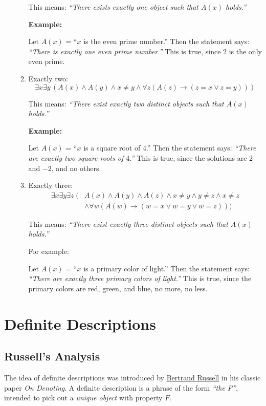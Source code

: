 \documentclass[12pt,a4paper,openany]{article}
\begin{document}
\begin{enumerate}
\begin{enumerate}
This means: \emph{``There exists exactly one object such that \(A(x)\)
holds.''}

\textbf{Example:}

Let \(A(x)\) = ``\(x\) is the even prime number.'' Then the statement
says: \emph{``There is exactly one even prime number.''} This is true,
since \(2\) is the only even prime.

\item
Exactly two:
\[
\exists x \exists y \, (A(x) \land A(y) \land x \neq y \land \forall z (A(z) \rightarrow (z = x \lor z = y)))
\]

This means: \emph{``There exist exactly two distinct objects such that
\(A(x)\) holds.''}

\textbf{Example:}

Let \(A(x)\) = ``\(x\) is a square root of \(4\).'' Then the statement
says: \emph{``There are exactly two square roots of \(4\).''} This is
true, since the solutions are \(2\) and \(-2\), and no others.

\item
Exactly three:
\begin{align*}
\exists x \exists y \exists z \; (&A(x) \land A(y) \land A(z) \land x \neq y \land y \neq z \land x \neq z \\
&\land \forall w (A(w) \rightarrow (w = x \lor w = y \lor w = z)))
\end{align*}


This means: \emph{``There exist exactly three distinct objects such
that \(A(x)\) holds.''}

For example:

Let \(A(x)\) = ``\(x\) is a primary color of light.'' Then the
statement says: \emph{``There are exactly three primary colors of
light.''} This is true, since the primary colors are red, green, and
blue, no more, no less.
\end{enumerate}
\end{enumerate}


\newpage
\section{Definite Descriptions} 

\subsection{Russell’s Analysis}
\label{russells-analysis}

The idea of definite descriptions was introduced by \href{https://en.wikipedia.org/wiki/Bertrand_Russell}{Bertrand Russell} in his classic paper \textit{On Denoting}. 
A definite description is a phrase of the form \textit{``the F''}, intended to pick out a \textit{unique object} with property $F$.
\end{document}
